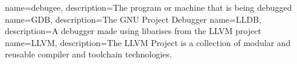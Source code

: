 {
    name=debugee,
    description={The program or machine that is being debugged}
}
{
    name=GDB,
    description={The GNU Project Debugger}
}
{
    name=LLDB,
    description={A debugger made using libarises from the LLVM project}
}
{
    name=LLVM,
    description={The LLVM Project is a collection of modular and reusable compiler and toolchain technologies.}
}





